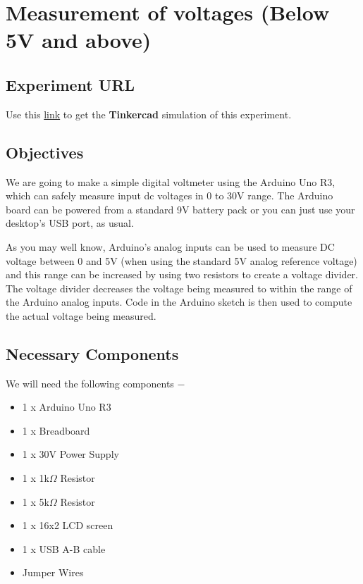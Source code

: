 \pagebreak\section{Measurement of voltages (Below 5V and above)}
\subsection{Experiment URL}
    Use this \href{https://www.tinkercad.com/things/awpboVDdbxj?sharecode=uw7s84LgESyuaN5hnURGDUiU3aelHYsxpXATCcO_EfU}{link} to get the \textbf{Tinkercad} simulation of this experiment.
\subsection{Objectives}
We are going to make a simple digital voltmeter using the Arduino Uno R3, which can safely measure input dc voltages in 0 to 30V range. The Arduino board can be powered from a standard 9V battery pack or you can just use your desktop's USB port, as usual.

As you may well know, Arduino’s analog inputs can be used to measure DC voltage between 0 and 5V (when using the standard 5V analog reference voltage) and this range can be increased by using two resistors to create a voltage divider. The voltage divider decreases the voltage being measured to within the range of the Arduino analog inputs. Code in the Arduino sketch is then used to compute the actual voltage being measured.

\subsection{Necessary Components}
We will need the following components −
\begin{itemize}
\item 1 x Arduino Uno R3
\item 1 x Breadboard
\item 1 x 30V Power Supply
\item 1 x 1k$\Omega$ Resistor
\item 1 x 5k$\Omega$ Resistor
\item 1 x 16x2 LCD screen
\item 1 x USB A-B cable
\item Jumper Wires
\end{itemize}


